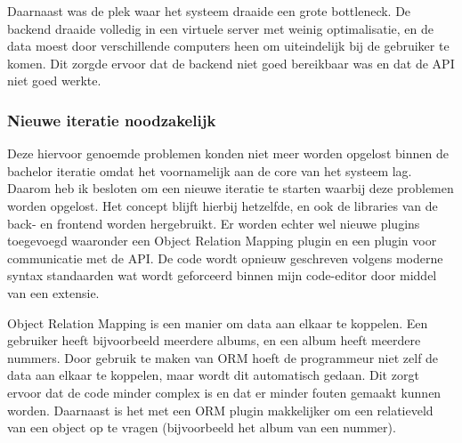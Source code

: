 Daarnaast was de plek waar het systeem draaide een grote bottleneck. De backend draaide volledig in een virtuele server met weinig optimalisatie, en de data moest door verschillende computers heen om uiteindelijk bij de gebruiker te komen. Dit zorgde ervoor dat de backend niet goed bereikbaar was en dat de API niet goed werkte.

\subsubsection*{Nieuwe iteratie noodzakelijk}
Deze hiervoor genoemde problemen konden niet meer worden opgelost binnen de bachelor iteratie omdat het voornamelijk aan de core van het systeem lag. Daarom heb ik besloten om een nieuwe iteratie te starten waarbij deze problemen worden opgelost. Het concept blijft hierbij hetzelfde, en ook de libraries van de back- en frontend worden hergebruikt. Er worden echter wel nieuwe plugins toegevoegd waaronder een Object Relation Mapping plugin en een plugin voor communicatie met de API. De code wordt opnieuw geschreven volgens moderne syntax standaarden wat wordt geforceerd binnen mijn code-editor door middel van een extensie.

Object Relation Mapping is een manier om data aan elkaar te koppelen. Een gebruiker heeft bijvoorbeeld meerdere albums, en een album heeft meerdere nummers. Door gebruik te maken van ORM hoeft de programmeur niet zelf de data aan elkaar te koppelen, maar wordt dit automatisch gedaan. Dit zorgt ervoor dat de code minder complex is en dat er minder fouten gemaakt kunnen worden. Daarnaast is het met een ORM plugin makkelijker om een relatieveld van een object op te vragen (bijvoorbeeld het album van een nummer).
